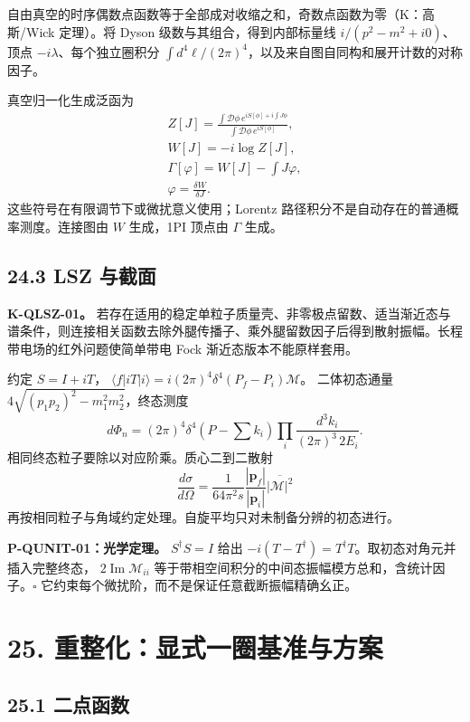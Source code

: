 \documentclass[
  11pt,
  oneside]{book}
\begin{document}
自由真空的时序偶数点函数等于全部成对收缩之和，奇数点函数为零（K：高斯/Wick
定理）。将 Dyson 级数与其组合，得到内部标量线 \(i/(p^2-m^2+i0)\)、顶点
\(-i\lambda\)、每个独立圈积分
\(\int d^4\ell/(2\pi)^4\)，以及来自图自同构和展开计数的对称因子。

真空归一化生成泛函为 \[
\begin{gathered}
Z[J]=\frac{\int\mathcal D\phi\,
e^{iS[\phi]+i\int J\phi}}{\int\mathcal D\phi\,e^{iS[\phi]}},
\\ W[J]=-i\log Z[J],\\
\Gamma[\varphi]=W[J]-\int J\varphi,\\
\varphi=\frac{\delta W}{\delta J}.
\end{gathered}
\] 这些符号在有限调节下或微扰意义使用；Lorentz
路径积分不是自动存在的普通概率测度。连接图由 \(W\) 生成，1PI 顶点由
\(\Gamma\) 生成。

\hypertarget{lsz-ux4e0eux622aux9762}{%
\section{24.3 LSZ 与截面}\label{lsz-ux4e0eux622aux9762}}

\textbf{K-QLSZ-01。}
若存在适用的稳定单粒子质量壳、非零极点留数、适当渐近态与谱条件，则连接相关函数去除外腿传播子、乘外腿留数因子后得到散射振幅。长程带电场的红外问题使简单带电
Fock 渐近态版本不能原样套用。

约定 \(S=I+iT\)，
\(\langle f|iT|i\rangle=i(2\pi)^4\delta^4(P_f-P_i)\mathcal M\)。
二体初态通量 \(4\sqrt{(p_1p_2)^2-m_1^2m_2^2}\)，终态测度 \[
d\Phi_n=(2\pi)^4\delta^4(P-\sum k_i)
\prod_i\frac{d^3k_i}{(2\pi)^3\,2E_i}.
\] 相同终态粒子要除以对应阶乘。质心二到二散射 \[
\frac{d\sigma}{d\Omega}=\frac1{64\pi^2s}
\frac{|\mathbf p_f|}{|\mathbf p_i|}\overline{|\mathcal M|^2}
\] 再按相同粒子与角域约定处理。自旋平均只对未制备分辨的初态进行。

\protect\hypertarget{p-qunit-01}{}{}

\textbf{P-QUNIT-01：光学定理。} \(S^\dagger S=I\) 给出
\(-i(T-T^\dagger)=T^\dagger T\)。取初态对角元并插入完整终态，
\(2\operatorname{Im}\mathcal M_{ii}\)
等于带相空间积分的中间态振幅模方总和，含统计因子。\(\square\)
它约束每个微扰阶，而不是保证任意截断振幅精确幺正。

\hypertarget{ch-25}{%
\chapter{25. 重整化：显式一圈基准与方案}\label{ch-25}}

\hypertarget{ux4e8cux70b9ux51fdux6570}{%
\section{25.1 二点函数}\label{ux4e8cux70b9ux51fdux6570}}
\end{document}
